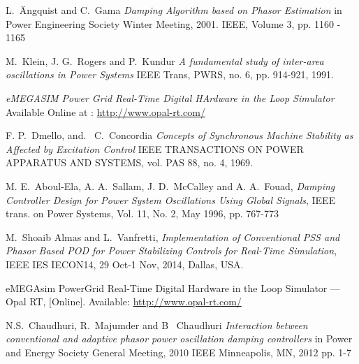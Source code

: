 \documentclass[journal]{IEEEtran}
\begin{document}

%
%
%
\begin{thebibliography}{1}

L.~\"{A}ngquist and C.~Gama  \emph{Damping Algorithm based on Phasor Estimation} in Power Engineering Society Winter Meeting, 2001. IEEE, Volume 3, pp. 1160 - 1165  

M.~Klein, J. G.~Rogers and P.~Kundur \emph{A fundamental study of inter-area oscillations in Power Systems} IEEE Trans, PWRS, no. 6, pp. 914-921, 1991. 

 \emph{eMEGASIM Power Grid Real-Time Digital HArdware in the Loop Simulator} Available Online at : \url{http://www.opal-rt.com/}

 F. P.~Dmello, and. \ C.~Concordia
  \emph{Concepts of Synchronous Machine Stability as Affected by Excitation Control} IEEE TRANSACTIONS ON POWER APPARATUS AND SYSTEMS, vol. PAS 88, no. 4, 1969. 
  
  M. E.~Aboul-Ela, A. A.~Sallam, J. D.~McCalley and A. A.~Fouad, \emph{Damping Controller Design for Power System Oscillations Using Global Signals}, IEEE trans. on Power Systems, Vol. 11, No. 2, May 1996, pp. 767-773
  
 M.~Shoaib Almas and L.~Vanfretti, \emph{Implementation of Conventional PSS and Phasor Based POD for Power Stabilizing Controls for Real-Time Simulation}, IEEE IES IECON14, 29 Oct-1 Nov, 2014, Dallas, USA.

 eMEGAsim PowerGrid Real-Time Digital Hardware in the Loop Simulator — Opal RT, [Online]. Available: \url{http://www.opal-rt.com/}

 N.S.~Chaudhuri, R.~Majumder and B~ Chaudhuri \emph{Interaction between conventional and adaptive phasor power oscillation damping controllers} in Power and Energy Society General Meeting, 2010 IEEE Minneapolis, MN, 2012 pp. 1-7


\end{thebibliography}
\end{document}
